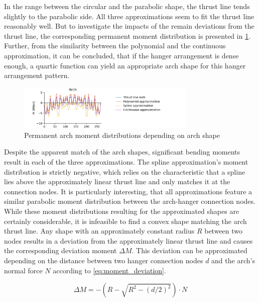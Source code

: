 In the range between the circular and the parabolic shape, the thrust line tends slightly to the parabolic side. All three approximations seem to fit the thrust line reasonably well. But to investigate the impacts of the remain deviations from the thrust line, the corresponding permanent moment distribution is presented in \cref{fig:arch_permanent_moments_13}. Further, from the similarity between the polynomial and the continuous approximation, it can be concluded, that if the hanger arrangement is dense enough, a quartic function can yield an appropriate arch shape for this hanger arrangement pattern. 

\begin{figure}[H]
    \centering
    \includegraphics[trim={1cm 0 3cm 0},clip, width=0.76\textwidth]{calculations/arch shape/permanent state_13.png}
    \caption{Permanent arch moment distributions depending on arch shape}
    \label{fig:arch_permanent_moments_13}
\end{figure}

Despite the apparent match of the arch shapes, significant bending moments result in each of the three approximations. The spline approximation's moment distribution is strictly negative, which relies on the characteristic that a spline lies above the approximately linear thrust line and only matches it at the connection nodes. It is particularly interesting, that all approximations feature a similar parabolic moment distribution between the arch-hanger connection nodes. While these moment distributions resulting for the approximated shapes are certainly considerable, it is infeasible to find a convex shape matching the arch thrust line. Any shape with an approximately constant radius $R$ between two nodes results in a deviation from the approximately linear thrust line and causes the corresponding deviation moment $\Delta M$. This deviation can be approximated depending on the distance between two hanger connection nodes $d$ and the arch's normal force $N$ according to \cref{eq:moment_deviation}.

\begin{equation}
    \Delta M=-\left(R-\sqrt{R^2-\left(d/2\right)^2}\right) \cdot N
    \label{eq:moment_deviation}
\end{equation}


